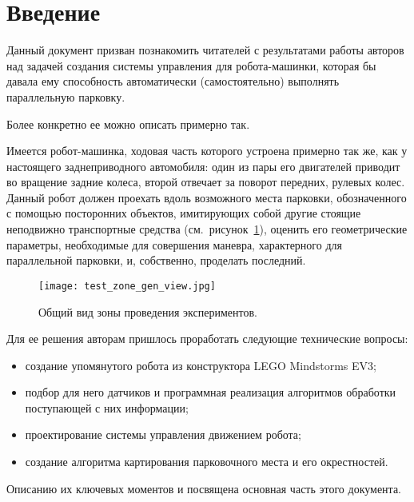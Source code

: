 \newpage
\section*{Введение}
Данный документ призван познакомить читателей с результатами работы авторов над задачей создания системы управления для робота-машинки, которая бы давала ему способность автоматически (самостоятельно) выполнять параллельную парковку.

Более конкретно ее можно описать примерно так.

Имеется робот-машинка, ходовая часть которого устроена примерно так же, как у настоящего заднеприводного автомобиля: один из пары его двигателей приводит во вращение задние колеса, второй отвечает за поворот передних, рулевых колес.
Данный робот должен проехать вдоль возможного места парковки, обозначенного с помощью посторонних объектов, имитирующих собой другие стоящие неподвижно транспортные средства (см.~рисунок~\ref{img_test_zone_gen_view}), оценить его геометрические параметры, необходимые для совершения маневра, характерного для параллельной парковки, и, собственно, проделать последний.

\begin{figure}[h]
    \centering
    \texttt{[image: test\_zone\_gen\_view.jpg]}
    \caption{Общий вид зоны проведения экспериментов.}
    \label{img_test_zone_gen_view}
\end{figure}

Для ее решения авторам пришлось проработать следующие технические вопросы:
\begin{itemize}
    \item создание упомянутого робота из конструктора LEGO Mindstorms EV3;
    \item подбор для него датчиков и программная реализация алгоритмов обработки поступающей с них информации;
    \item проектирование системы управления движением робота;
    \item создание алгоритма картирования парковочного места и его окрестностей.
\end{itemize}
Описанию их ключевых моментов и посвящена основная часть этого документа.
